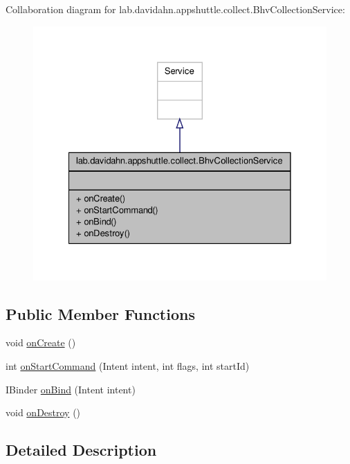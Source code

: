 \-Collaboration diagram for lab.\-davidahn.\-appshuttle.\-collect.\-Bhv\-Collection\-Service\-:
\nopagebreak
\begin{figure}[H]
\begin{center}
\leavevmode
\includegraphics[width=328pt]{classlab_1_1davidahn_1_1appshuttle_1_1collect_1_1_bhv_collection_service__coll__graph}
\end{center}
\end{figure}
\subsection*{\-Public \-Member \-Functions}
\begin{DoxyCompactItemize}
\item 
void \hyperlink{classlab_1_1davidahn_1_1appshuttle_1_1collect_1_1_bhv_collection_service_a027ef1774f52918afcb5c0a49900ea8d}{on\-Create} ()
\item 
int \hyperlink{classlab_1_1davidahn_1_1appshuttle_1_1collect_1_1_bhv_collection_service_af6881bbf0d333bd827249930bada3ada}{on\-Start\-Command} (\-Intent intent, int flags, int start\-Id)
\item 
\-I\-Binder \hyperlink{classlab_1_1davidahn_1_1appshuttle_1_1collect_1_1_bhv_collection_service_ad07d352cf2c6130c1cce73bd70bbbb20}{on\-Bind} (\-Intent intent)
\item 
void \hyperlink{classlab_1_1davidahn_1_1appshuttle_1_1collect_1_1_bhv_collection_service_aaaa68975767eed6beeaab328af60872b}{on\-Destroy} ()
\end{DoxyCompactItemize}


\subsection{\-Detailed \-Description}


